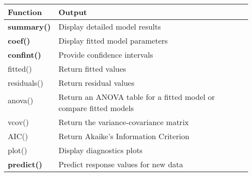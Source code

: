 \begin{tabular}{*{2}{l}}
  Function & Output \\
  \midrule
  \textbf{summary()} & Display detailed model results \\
  \textbf{coef()} & Display fitted model parameters \\
  \textbf{confint()} & Provide confidence intervals \\
  fitted() & Return fitted values \\
  residuals() & Return residual values \\
  anova() & \multirow{2}{.6\textwidth}{Return an ANOVA table for a fitted model or compare fitted models} \\
  \\
  vcov() & Return the variance-covariance matrix\\
  AIC() & Return Akaike's Information Criterion\\
  plot() & Display diagnostics plots \\
  \textbf{predict()} & Predict response values for new data\\
\end{tabular}
